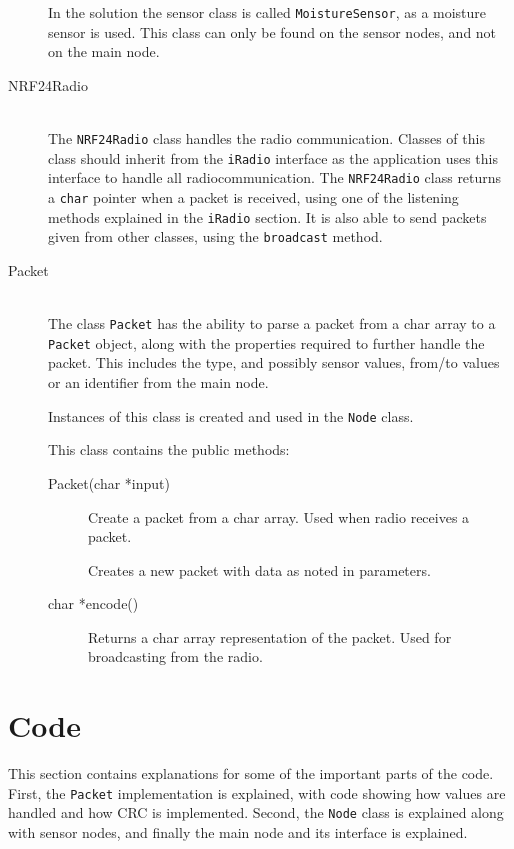 \begin{description}
In the solution the sensor class is called \texttt{MoistureSensor}, as a moisture sensor is used. This class can only be found on the sensor nodes, and not on the main node.


\item[NRF24Radio] \hfill \\
The \texttt{NRF24Radio} class handles the radio communication. Classes of this class should inherit from the \texttt{iRadio} interface as the application uses this interface to handle all radiocommunication. The \texttt{NRF24Radio} class returns a \texttt{char} pointer when a packet is received, using one of the listening methods explained in the \texttt{iRadio} section. It is also able to send packets given from other classes, using the \texttt{broadcast} method.

\item[Packet] \hfill \\
The class \texttt{Packet} has the ability to parse a packet from a char array to a \texttt{Packet} object, along with the properties required to further handle the packet. This includes the type, and possibly sensor values, from/to values or an identifier from the main node.

Instances of this class is created and used in the \texttt{Node} class.

This class contains the public methods:
\begin{description}
\item[Packet(char *input)] Create a packet from a char array. Used when radio receives a packet.
\item[{\parbox[t]{0.6\linewidth}{Packet(PacketType packetTypeInput, \\ uint16\_t addresserInput, \\ uint16\_t addresseeInput, \\ uint16\_t originInput, \\ uint16\_t value1Input, \\ uint16\_t value2Input, \\ uint16\_t value3Input)}}] \item[] Creates a new packet with data as noted in parameters.
\item[char *encode()] Returns a char array representation of the packet. Used for broadcasting from the radio.
\end{description}

\end{description}


\section{Code}
This section contains explanations for some of the important parts of the code. First, the \texttt{Packet} implementation is explained, with code showing how values are handled and how CRC is implemented. Second, the \texttt{Node} class is explained along with sensor nodes, and finally the main node and its interface is explained.



